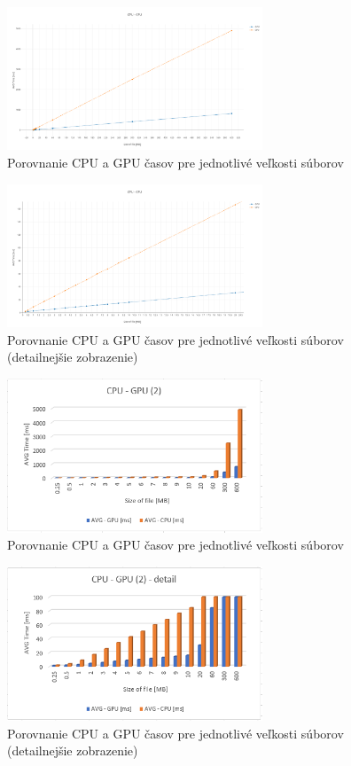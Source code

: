 \documentclass[conference]{IEEEtran}
\begin{document}
\begin{figure}[h!]
\centering
\includegraphics[width=3in]{img/CPU-GPU-new}
\caption{Porovnanie CPU a GPU časov pre jednotlivé veľkosti súborov}
\end{figure}

\begin{figure}[h!]
\centering
\includegraphics[width=3in]{img/CPU-GPU-new2}
\caption{Porovnanie CPU a GPU časov pre jednotlivé veľkosti súborov (detailnejšie zobrazenie)}
\end{figure}

\begin{figure}[h!]
\centering
\includegraphics[width=3in]{img/CPU-GPU2}
\caption{Porovnanie CPU a GPU časov pre jednotlivé veľkosti súborov}
\end{figure}

\begin{figure}[h!]
\centering
\includegraphics[width=3in]{img/CPU-GPUdetail2}
\caption{Porovnanie CPU a GPU časov pre jednotlivé veľkosti súborov (detailnejšie zobrazenie)}
\end{figure}
\end{document}
